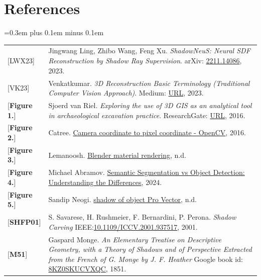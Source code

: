 \documentclass[12pt,a4paper]{article}
\theoremstyle{definition}
\begin{document}
\section*{References}
\spaceskip=0.3em plus 0.1em minus 0.1em
\begin{tabular}{p{}p{}}
{[LWX23]}               & Jingwang Ling, Zhibo Wang, Feng Xu. \textit{ShadowNeuS: Neural SDF Reconstruction by Shadow Ray Supervision}. arXiv: \href{https://arxiv.org/abs/2211.14086}{2211.14086}, 2023. \hypertarget{[LWX23]}{}  \\
{[VK23]}                & Venkatkumar. \textit{3D Reconstruction Basic Terminology (Traditional Computer Vision Approach)}. Medium: \href{https://medium.com/@VK_Venkatkumar/3d-reconstruction-basic-terminology-traditional-computer-vision-e148496f389}{URL}, 2023. \hypertarget{[VK23]}{} \\
{[\textbf{Figure 1.}]}  & Sjoerd van Riel. \textit{Exploring the use of 3D GIS as an analytical tool in archaeological excavation practice}. ResearchGate: \href{https://www.researchgate.net/figure/Structure-from-Motion-SfM-photogrammetric-principle-Source-Theia-sfmorg-2016_fig3_303824023}{URL}, 2016. \hypertarget{[Fig 1]}{} \\
{[\textbf{Figure 2.}]}  & Catree. \href{https://stackoverflow.com/questions/38494485/camera-coordinate-to-pixel-coordinate-opencv}{Camera coordinate to pixel coordinate - OpenCV}, 2016. \hypertarget{[Fig 2]}{} \\
{[\textbf{Figure 3.}]}  & Lemanoosh. \href{https://lemanoosh.com/online-course-blender-material-rendering/}{Blender material rendering}, n.d. \hypertarget{[Fig 3]}{}  \\
{[\textbf{Figure 4.}]}  & Michael Abramov. \href{https://keymakr.com/blog/semantic-segmentation-vs-object-detection-understanding-the-differences/}{Semantic Segmentation vs Object Detection: Understanding the Differences}, 2024. \hypertarget{[Fig 4]}{}  \\
{[\textbf{Figure 5.}]}  & Sandip Neogi. \href{https://www.vecteezy.com/vector-art/42399612-shadow-of-object}{shadow of object Pro Vector}, n.d. \hypertarget{[Fig 5]}{}  \\
{[\textbf{SHFP01}]}     & S. Savarese, H. Rushmeier, F. Bernardini, P. Perona. \textit{Shadow Carving} IEEE:\href{https://ieeexplore.ieee.org/document/937517}{10.1109/ICCV.2001.937517}, 2001. \hypertarget{[SHFP01]}{}  \\
{[\textbf{M51}]}        & Gaspard Monge. \textit{An Elementary Treatise on Descriptive Geometry, with a Theory of Shadows and of Perspective Extracted from the French of G. Monge by J. F. Heather} Google book id: \href{https://archive.org/details/bub_gb_8KZ0SKUCVXQC/page/n17/mode/2up}{8KZ0SKUCVXQC}, 1851. \hypertarget{[M51]}{}  \\

\end{tabular}
\end{document}

